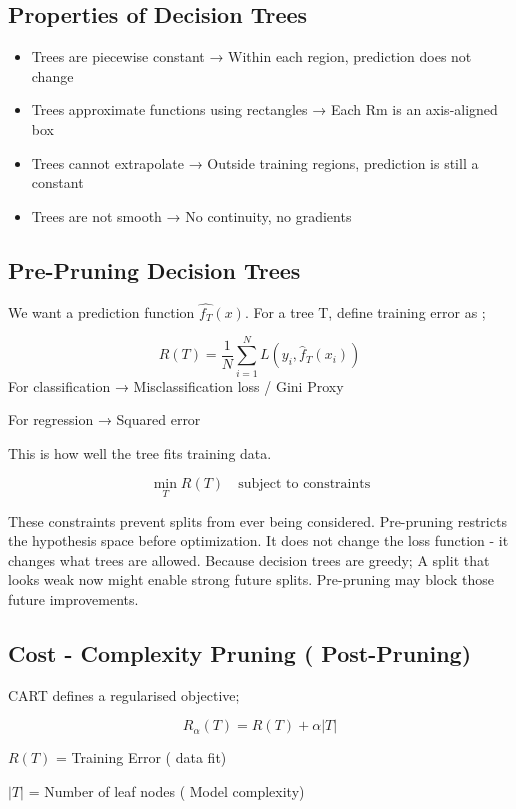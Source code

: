 \documentclass[10pt,a4paper]{article}
\begin{document}
		\subsection{Properties of Decision Trees}
	
		\begin{itemize}
			\item Trees are piecewise constant → Within each region, prediction does not change
			\item Trees approximate functions using rectangles → Each Rm is an axis-aligned box
			\item Trees cannot extrapolate → Outside training regions, prediction is still a constant
			\item Trees are not smooth → No continuity, no gradients
		\end{itemize}
	
		\subsection{Pre-Pruning Decision Trees}
	
	
		We want a prediction function $\hat{f_T}(x)$. For a tree T, define training error as ;
	
		$$	R(T) = \frac{1}{N} \sum_{i=1}^{N} L(y_i, \hat{f}_T(x_i))
		$$
		For classification → Misclassification loss / Gini Proxy
	
		For regression → Squared error
	
		This is how well the tree fits training data.
	
		$$	\min_T R(T) \quad \text{subject to constraints}
		$$
	
	
		These constraints prevent splits from ever being considered. Pre-pruning restricts the hypothesis space before optimization. It does not change the loss function - it changes what trees are allowed. Because decision trees are greedy; A split that looks weak now might enable strong future splits. Pre-pruning may block those future improvements.
	
		\subsection{Cost - Complexity Pruning ( Post-Pruning)}
	
		CART defines a regularised objective;
	
	
		$$		R_\alpha(T) = R(T) + \alpha |T|
		$$
	
		$R(T)$ = Training Error ( data fit)
	
		$|T|$ = Number of leaf nodes ( Model complexity)
	
\end{document}

